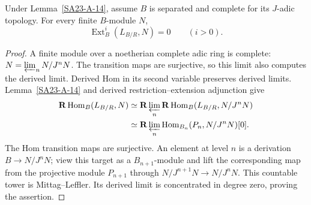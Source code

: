 \begin{lemma}
\label{SA23-A-15}
Under Lemma~\ref{SA23-A-14}, assume $B$ is separated and complete
for its $J$-adic topology. For every finite $B$-module $N$,
\[
 \operatorname{Ext}^i_B(L_{B/R},N)=0\qquad(i>0).
\]
\end{lemma}
\begin{proof}
A finite module over a noetherian complete adic ring is complete:
$N=\varprojlim_nN/J^nN$. The transition maps are surjective, so this
limit also computes the derived limit. Derived Hom in its second
variable preserves derived limits. Lemma~\ref{SA23-A-14} and
derived restriction--extension adjunction give
\[
\begin{split}
 \mathbf R\operatorname{Hom}_B(L_{B/R},N)
 &\simeq \mathbf R\varprojlim_n
       \mathbf R\operatorname{Hom}_B(L_{B/R},N/J^nN)\\
 &\simeq \mathbf R\varprojlim_n
       \operatorname{Hom}_{B_n}(P_n,N/J^nN)[0].
\end{split}
\]
The Hom transition maps are surjective. An element at level $n$
is a derivation $B\to N/J^nN$; view this target as a
$B_{n+1}$-module and lift the corresponding map from the projective
module $P_{n+1}$ through $N/J^{n+1}N\to N/J^nN$.
This countable tower is Mittag--Leffler. Its derived limit is
concentrated in degree zero, proving the assertion.
\end{proof}

